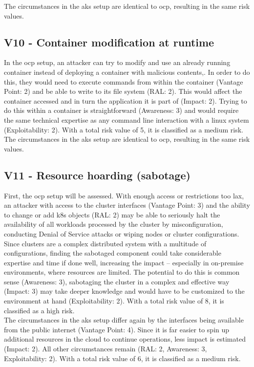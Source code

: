 The circumstances in the \gls{aks} setup are identical to \gls{ocp}, resulting in the same risk values.

\subsection{V10 - Container modification at runtime}

In the \gls{ocp} setup, an attacker can try to modify and use an already running container instead of deploying a container with malicious contents,. In order to do this, they would need to execute commands from within the container (Vantage Point: 2) and be able to write to its file system (RAL: 2). This would affect the container accessed and in turn the application it is part of (Impact: 2).
Trying to do this within a container is straightforward (Awareness: 3) and would require the same technical expertise as any command line interaction with a linux system (Exploitability: 2).
With a total risk value of 5, it is classified as a medium risk. \\


The circumstances in the \gls{aks} setup are identical to \gls{ocp}, resulting in the same risk values.

\subsection{V11 - Resource hoarding (sabotage)}

First, the \gls{ocp} setup will be assessed.
With enough access or restrictions too lax, an attacker with access to the cluster interfaces (Vantage Point: 3) and the ability to change or add \gls{k8s} objects (RAL: 2)  may be able to seriously halt the availability of all workloads processed by the cluster by misconfiguration, conducting Denial of Service attacks or wiping nodes or cluster configurations. Since clusters are a complex distributed system with a multitude of configurations, finding the sabotaged component could take considerable expertise and time if done well, increasing the impact – especially in on-premise environments, where resources are limited.
The potential to do this is common sense (Awareness: 3), sabotaging the cluster in a complex and effective way (Impact: 3) may take deeper knowledge and would have to be customized to the environment at hand (Exploitability: 2).
With a total risk value of 8, it is classified as a high risk. \\


The circumstances in the \gls{aks} setup differ again by the interfaces being available from the public internet (Vantage Point: 4).
Since it is far easier to spin up additional resources in the cloud to continue operations, less impact is estimated (Impact: 2).
All other circumstances remain (RAL: 2, Awareness: 3, Exploitability: 2).
With a total risk value of 6, it is classified as a medium risk.

